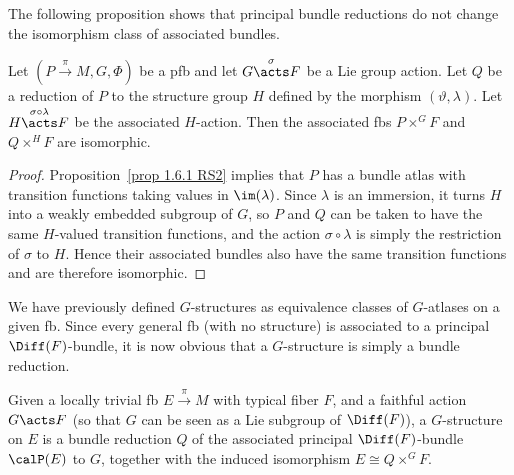 The following proposition shows that principal bundle reductions do not change the isomorphism class of associated bundles.

\begin{prop}[{{\cite[Prop.~1.6.7]{RS2}}}]\label{prop 1.6.7 RS2}
    Let $(P\overset{\pi}{\to}M, G,\Phi)$ be a \gls{pfb} and let $G\overset{\sigma}{\acts}F$ be a Lie group action. Let $Q$ be a reduction of $P$ to the structure group $H$ defined by the morphism $(\vartheta,\lambda)$. Let $H\overset{\sigma\circ\lambda}{\acts}F$ be the associated $H$-action. Then the associated \glspl{fb} $P\times^G F$ and $Q\times^H F$ are isomorphic.
\end{prop}
\begin{proof}
    Proposition~\ref{prop 1.6.1 RS2} implies that $P$ has a bundle atlas with transition functions taking values in $\im(\lambda)$. Since $\lambda$ is an immersion, it turns $H$ into a weakly embedded subgroup of $G$, so $P$ and $Q$ can be taken to have the same $H$-valued transition functions, and the action $\sigma\circ\lambda$ is simply the restriction of $\sigma$ to $H$. Hence their associated bundles also have the same transition functions and are therefore isomorphic.
\end{proof}

We have previously defined $G$-structures as equivalence classes of $G$-atlases on a given \gls{fb}. Since every general \gls{fb} (with no structure) is associated to a principal $\Diff(F)$-bundle, it is now obvious that a $G$-structure is simply a bundle reduction.

\begin{defn}[$G$-structure]
    Given a locally trivial \gls{fb} $E\overset{\pi}{\to}M$ with typical fiber $F$, and a faithful action $G\acts F$ (so that $G$ can be seen as a Lie subgroup of $\Diff(F)$), a $G$-structure on $E$ is a bundle reduction $Q$ of the associated principal $\Diff(F)$-bundle $\calP(E)$ to $G$, together with the induced isomorphism $E\cong Q\times^G F$. 
\end{defn}

